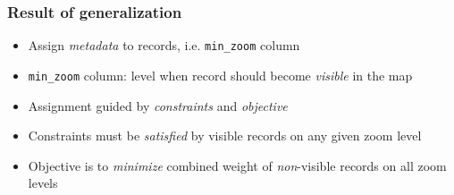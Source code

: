 \documentclass{beamer}
\begin{document}
\frame
{
  \frametitle{Result of generalization}
  \begin{itemize}
  \item Assign \emph{metadata} to records, i.e. \texttt{min\_zoom} column
  \item \texttt{min\_zoom} column: level when record should become \emph{visible} in the map
  \item Assignment guided by \emph{constraints} and \emph{objective}
  \item Constraints must be \emph{satisfied} by visible records on any given zoom level
  \item Objective is to \emph{minimize} combined weight of \emph{non}-visible records on all zoom levels
  \end{itemize}
  \begin{center}
  \end{center}
}
\end{document}
